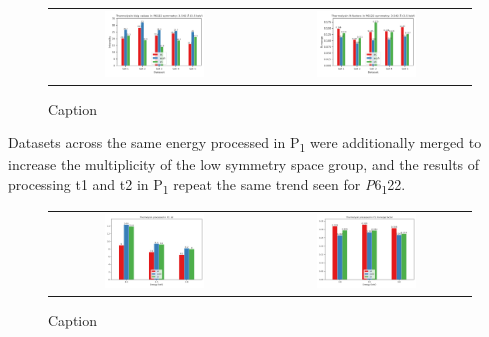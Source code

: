 \begin{figure}[h]
    \centering
    \begin{tabular}{cc}
    \includegraphics[width = 0.5\textwidth]{plots/exp1/tlys_2_P6122/3p5_I_over_sigma.png} & \includegraphics[width = 0.5\textwidth]{plots/exp1/tlys_2_P6122/3p5_rmerges.png}
    \end{tabular}
    \caption{Caption}
    \label{fig:tlys_2_p6}
\end{figure}


Datasets across the same energy processed in P\textsubscript{1} were additionally merged to increase the multiplicity of the low symmetry space group, and the results of processing \ac{t1} and \ac{t2} in P\textsubscript{1} repeat the same trend seen for \textit{P}6\textsubscript{1}22.

\begin{figure}[h]
    \centering
    \begin{tabular}{cc}
    \includegraphics[width = 0.5\textwidth]{plots/exp1/tlys_9_P1/I_over_sigma.png} & \includegraphics[width = 0.5\textwidth]{plots/exp1/tlys_9_P1/rmerges.png}
    \end{tabular}
    \caption{Caption}
    \label{fig:tlys_2_p6}
\end{figure}

